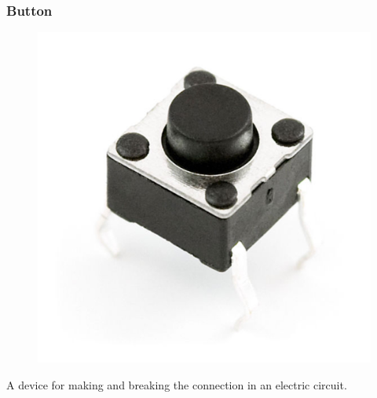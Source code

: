 \begin{frame}
	\frametitle{Button}
	\begin{figure}
   		\includegraphics[scale=.2]{assets/butt} 
	\end{figure}
	A device for making and breaking the connection in an electric circuit.
\end{frame}




